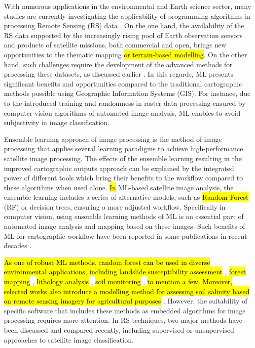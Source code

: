 \documentclass[climate,article,submit,pdftex,moreauthors]{Definitions/mdpi}
\begin{document}
{With numerous applications in the environmental and Earth science sector, many studies are currently investigating the applicability of programming algorithms in processing Remote Sensing (RS) data \cite{10080513,10334172,Lemenkova202227,9964623,jimaging9050098,9393066}. On the one hand, the availability of the RS data supported by the increasingly rising pool of Earth observation sensors and products of satellite missions, both commercial and open, brings new opportunities to the thematic mapping \hl{or terrain-based modelling}. On the other hand, such challenges require the development of the advanced methods for processing these datasets, as discussed earlier \cite{JASIEWICZ20111525}. In this regards, ML presents significant benefits and opportunities compared to the traditional cartographic methods possible using Geographic Information Systems (GIS). For instance, due to the introduced training and randomness in raster data processing ensured by computer-vision algorithms of automated image analysis, ML enables to avoid subjectivity in image classification.{ } 

Ensemble learning approach of image processing is the method of image processing that applies several learning paradigms to achieve high-performance satellite image processing. The effects of the ensemble learning resulting in the improved cartographic outputs approach can be explained by the integrated power of different tools which bring their benefits to the workflow compared to these algorithms when used alone. \hl{In }ML-based satellite image analysis, the ensemble learning includes a series of alternative models, such as \hl{Random Forest} (RF) or decision trees, ensuring a more adjusted workflow. Specifically in computer vision, using ensemble learning methods of ML is an essential part of automated image analysis and mapping based on these images. Such benefits of ML for cartographic workflow have been reported in some publications in recent decades \cite{YOO2019155,SINGH2021100624,MULIK2023106697}. 

\hl{As one of robust ML methods, random forest can be used in diverse environmental applications, including landslide susceptibility assessment} \cite{rs16193663,land14040839,land14040722}, \hl{forest mapping} \cite{app15073977}, \hl{lithology analysis} \cite{rs17071314}, \hl{soil monitoring} \cite{nitrogen6020023}, \hl{to mention a few. Moreover, selected works also introduce a modelling method for assessing soil salinity based on remote sensing imagery for agricultural purposes} \cite{agriculture15030323,agriculture15030339,agronomy15040963}. However, the suitability of specific software that includes these methods as embedded algorithms for image processing requires more attention. In RS techniques, two major methods have been discussed and compared recently, including supervised \cite{GOLDBLATT2018253,MARTINEZMONTOYA2010978,INZANA200359} or unsupervised \cite{SHIH199497,LU2023116898,Lemenkova202322} approaches to satellite image classification.

}
\end{document}
